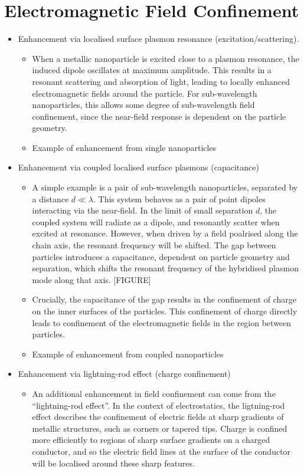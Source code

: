 \section{Electromagnetic Field Confinement}\label{sec:Plasmonics:confinement}
\begin{itemize}
    \item Enhancement via localised surface plasmon resonance (excitation/scattering). 
    \begin{itemize}
        \item When a metallic nanoparticle is excited close to a plasmon resonance, the induced dipole oscillates at maximum amplitude. This results in a resonant scattering and absorption of light, leading to locally enhanced electromagnetic fields around the particle. For sub-wavelength nanoparticles, this allows some degree of sub-wavelength field confinement, since the near-field response is dependent on the particle geometry.
        \item Example of enhancement from single nanoparticles
    \end{itemize}
    \item Enhancement via coupled localised surface plasmons (capacitance)
        \begin{itemize}
            \item A simple example is a pair of sub-wavelength nanoparticles, separated by a distance $d \ll \lambda$. This system behaves as a pair of point dipoles interacting via the near-field. In the limit of small separation $d$, the coupled system will radiate as a dipole, and resonantly scatter when excited at resonance. However, when driven by a field poalrised along the chain axis, the resonant frequency will be shifted. The gap between particles introduces a capacitance, dependent on particle geometry and separation, which shifts the resonant frequency of the hybridised plasmon mode along that axis. [FIGURE]
            \item Crucially, the capacitance of the gap results in the confinement of charge on the inner surfaces of the particles. This confinement of charge directly leads to confinement of the electromagnetic fields in the region between particles.
            \item Example of enhancement from coupled nanoparticles
        \end{itemize}
    \item Enhancement via lightning-rod effect (charge confinement)
    \begin{itemize}
        \item An additional enhancement in field confinement can come from the ``lightning-rod effect''. In the context of electrostatics, the ligtning-rod effect describes the confinement of electric fields at sharp gradients of metallic structures, such as corners or tapered tips. Charge is confined more efficiently to regions of sharp surface gradients on a charged conductor, and so the electric field lines at the surface of the conductor will be localised around these sharp features.

\end{itemize}
\end{itemize}
